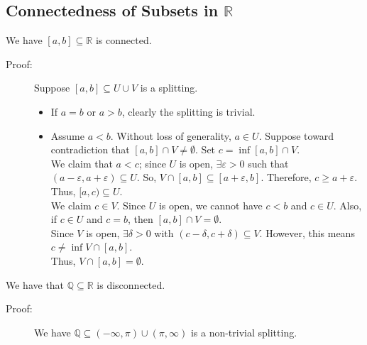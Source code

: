\documentclass[9pt]{extarticle}
\newcommand{\Q}{\mathbb{Q}}
\newcommand{\R}{\mathbb{R}}
\begin{document}
  \subsection{Connectedness of Subsets in $\R$}%
  We have $[a,b]\subseteq \R$ is connected.
  \begin{description}
    \item[Proof:] Suppose $[a,b]\subseteq U\cup V$ is a splitting.
      \begin{itemize}
        \item If $a=b$ or $a>b$, clearly the splitting is trivial.
        \item Assume $a< b$. Without loss of generality, $a\in U$. Suppose toward contradiction that $[a,b]\cap V \neq \emptyset$. Set $c = \inf [a,b]\cap V$.\\

          We claim that $a<c$; since $U$ is open, $\exists \varepsilon > 0$ such that $(a-\varepsilon,a+\varepsilon) \subseteq U$. So, $V\cap [a,b]\subseteq [a+\varepsilon,b]$. Therefore, $c \geq a+\varepsilon$. Thus, $[a,c)\subseteq U$.\\

          We claim $c\in V$. Since $U$ is open, we cannot have $c<b$ and $c\in U$. Also, if $c\in U$ and $c = b$, then $[a,b]\cap V = \emptyset$.\\

          Since $V$ is open, $\exists \delta > 0$ with $(c-\delta,c+\delta)\subseteq V$. However, this means $c\neq \inf V\cap [a,b]$.\\

          Thus, $V\cap [a,b] = \emptyset$.
      \end{itemize}
  \end{description}
  We have that $\Q\subseteq \R$ is disconnected.
  \begin{description}
    \item[Proof:] We have $\Q\subseteq (-\infty,\pi)\cup(\pi,\infty)$ is a non-trivial splitting.
  \end{description}
\end{document}
